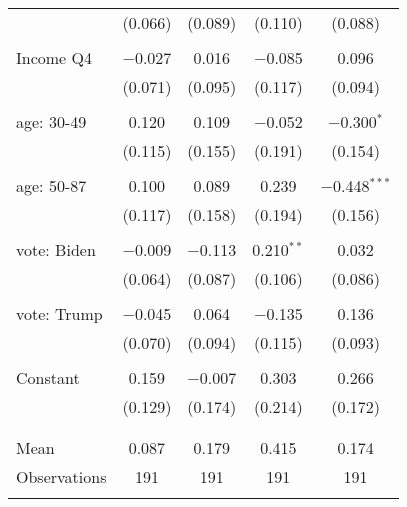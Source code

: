 \begin{tabular}{@{\extracolsep{5pt}}lcccc}
  & (0.066) & (0.089) & (0.110) & (0.088) \\ 
  & & & & \\ 
 Income Q4 & $-$0.027 & 0.016 & $-$0.085 & 0.096 \\ 
  & (0.071) & (0.095) & (0.117) & (0.094) \\ 
  & & & & \\ 
 age: 30-49 & 0.120 & 0.109 & $-$0.052 & $-$0.300$^{*}$ \\ 
  & (0.115) & (0.155) & (0.191) & (0.154) \\ 
  & & & & \\ 
 age: 50-87 & 0.100 & 0.089 & 0.239 & $-$0.448$^{***}$ \\ 
  & (0.117) & (0.158) & (0.194) & (0.156) \\ 
  & & & & \\ 
 vote: Biden & $-$0.009 & $-$0.113 & 0.210$^{**}$ & 0.032 \\ 
  & (0.064) & (0.087) & (0.106) & (0.086) \\ 
  & & & & \\ 
 vote: Trump & $-$0.045 & 0.064 & $-$0.135 & 0.136 \\ 
  & (0.070) & (0.094) & (0.115) & (0.093) \\ 
  & & & & \\ 
 Constant & 0.159 & $-$0.007 & 0.303 & 0.266 \\ 
  & (0.129) & (0.174) & (0.214) & (0.172) \\ 
  & & & & \\ 
\hline \\[-1.8ex] 
Mean & 0.087 & 0.179 & 0.415 & 0.174 \\ 
Observations & 191 & 191 & 191 & 191 \\ 
\hline 
\hline \\[-1.8ex] 
\end{tabular} 
